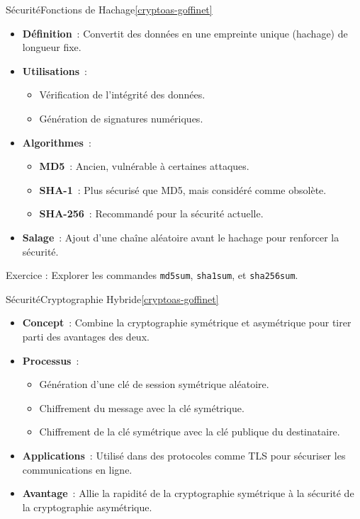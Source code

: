 \documentclass{beamer}
\begin{document}
    \begin{frame}{Sécurité}{Fonctions de Hachage\cref{cryptoas-goffinet}}
        \begin{itemize}
            \item \textbf{Définition}~: Convertit des données en une empreinte unique (hachage) de longueur fixe.
            \item \textbf{Utilisations}~:
            \begin{itemize}
                \item Vérification de l'intégrité des données.
                \item Génération de signatures numériques.
            \end{itemize}
            \item \textbf{Algorithmes}~:
            \begin{itemize}
                \item \textbf{MD5}~: Ancien, vulnérable à certaines attaques.
                \item \textbf{SHA-1}~: Plus sécurisé que MD5, mais considéré comme obsolète.
                \item \textbf{SHA-256}~: Recommandé pour la sécurité actuelle.
            \end{itemize}
            \item \textbf{Salage}~: Ajout d'une chaîne aléatoire avant le hachage pour renforcer la sécurité.
        \end{itemize}
        Exercice \execcounterdispinc: Explorer les commandes \lstinline{md5sum}, \lstinline{sha1sum}, et \lstinline{sha256sum}.
    \end{frame}

    \begin{frame}{Sécurité}{Cryptographie Hybride\cref{cryptoas-goffinet}}
        \begin{itemize}
            \item \textbf{Concept}~: Combine la cryptographie symétrique et asymétrique pour tirer parti des avantages des deux.
            \item \textbf{Processus}~:
            \begin{itemize}
                \item Génération d'une clé de session symétrique aléatoire.
                \item Chiffrement du message avec la clé symétrique.
                \item Chiffrement de la clé symétrique avec la clé publique du destinataire.
            \end{itemize}
            \item \textbf{Applications}~: Utilisé dans des protocoles comme TLS pour sécuriser les communications en ligne.
            \item \textbf{Avantage}~: Allie la rapidité de la cryptographie symétrique à la sécurité de la cryptographie asymétrique.
        \end{itemize}
    \end{frame}
\end{document}
